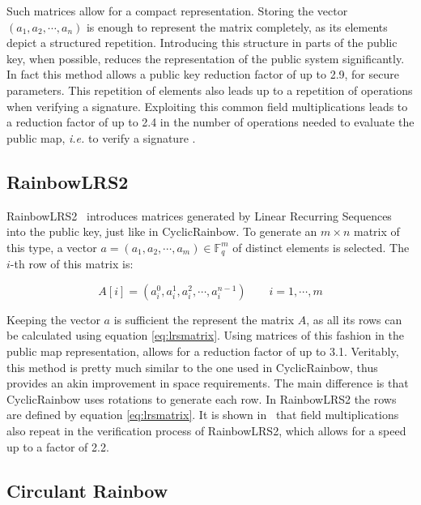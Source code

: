 \documentclass{ufsctex/ufsctex}
\begin{document}
Such matrices allow for a compact representation. Storing the vector $(a_1,
a_2, \cdots, a_n)$ is enough to represent the matrix completely, as its
elements depict a structured repetition. Introducing this structure in parts of
the public key, when possible, reduces the representation of the public system
significantly. In fact this method allows a public key reduction factor of up
to 2.9, for secure parameters. This repetition of elements also leads up to a
repetition of operations when verifying a signature. Exploiting this common
field multiplications leads to a reduction factor of up to 2.4 in the number of
operations needed to evaluate the public map, \textit{i.e.} to verify a
signature \cite{petzoldt2013thesis}.

\subsection{RainbowLRS2}

RainbowLRS2~\cite{petzoldt2013thesis} introduces matrices generated by Linear
Recurring Sequences into the public key, just like in CyclicRainbow. To
generate an $m \times n$ matrix of this type, a vector $a = (a_1, a_2, \cdots,
a_m) \in \mathbb{F}_q^m$ of distinct elements is selected. The $i$-th row of
this matrix is:

\begin{equation}\label{eq:lrsmatrix}
A[i] = (a_i^0, a_i^1, a_i^2, \cdots, a_i^{n-1}) \qquad i = 1, \cdots, m
\end{equation}

Keeping the vector $a$ is sufficient the represent the matrix $A$, as all its
rows can be calculated using equation \ref{eq:lrsmatrix}. Using matrices of
this fashion in the public map representation, allows for a reduction factor of
up to 3.1. Veritably, this method is pretty much similar to the one used in
CyclicRainbow, thus provides an akin improvement in space requirements. The
main difference is that CyclicRainbow uses rotations to generate each row. In
RainbowLRS2 the rows are defined by equation \ref{eq:lrsmatrix}. It is shown
in~\cite{petzoldt2013thesis} that field multiplications also repeat in the
verification process of RainbowLRS2, which allows for a speed up to a factor of
2.2.



\subsection{Circulant Rainbow}
\end{document}
